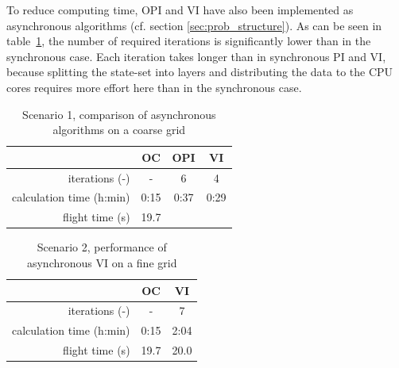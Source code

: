 To reduce computing time, OPI and VI have also been implemented as asynchronous algorithms (cf. section \ref{sec:prob_structure}). As can be seen in table~\ref{tab:2d_flight_data_500m_async}, the number of required iterations is significantly lower than in the synchronous case. Each iteration takes longer than in synchronous PI and VI, because splitting the state-set into layers and distributing the data to the CPU cores requires more effort here than in the synchronous case.

\begin{table}[htb]
	\begin{center}
		\begin{tabular}{r|c c c}
			& OC & OPI & VI \\ \hline
			iterations (-) & - & 6 & 4 \\
			calculation time (h:min) & 0:15 & 0:37 & 0:29  \\
			flight time (s) & 19.7 & &
		\end{tabular}
		\caption{Scenario 1, comparison of asynchronous algorithms on a coarse grid}
		\label{tab:2d_flight_data_500m_async}
	\end{center}
\end{table}
\begin{table}[htb]
	\begin{center}
		\begin{tabular}{r|c c}
			& OC & VI \\ \hline
			iterations (-) & - & 7 \\
			calculation time (h:min) & 0:15 & 2:04 \\
			flight time (s) & 19.7 & 20.0
		\end{tabular}
		\caption{Scenario 2, performance of asynchronous VI on a fine grid}
		\label{tab:2d_flight_data_500m_async_fine_grid}
	\end{center}
\end{table}
